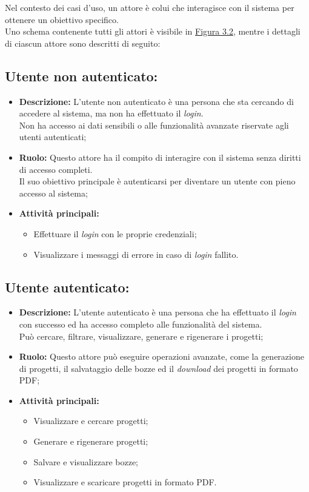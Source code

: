 Nel contesto dei casi d'uso, un attore è colui che interagisce con il sistema per ottenere un obiettivo specifico.\\
Uno schema contenente tutti gli attori è visibile in {\hyperref[fig:attori-casi-duso]{Figura 3.2}}, mentre i dettagli di ciascun attore sono descritti di seguito:

\subsection*{Utente non autenticato:}

\begin{itemize}
    \item \textbf{Descrizione:}  L'utente non autenticato è una persona che sta cercando di accedere al sistema, ma non ha effettuato il \textit{login}.\\
    Non ha accesso ai dati sensibili o alle funzionalità avanzate riservate agli utenti autenticati;
    \item \textbf{Ruolo:} Questo attore ha il compito di interagire con il sistema senza diritti di accesso completi.\\
    Il suo obiettivo principale è autenticarsi per diventare un utente con pieno accesso al sistema;
    \item \textbf{Attività principali:}
        \begin{itemize}
            \item Effettuare il \textit{login} con le proprie credenziali;
            \item Visualizzare i messaggi di errore in caso di \textit{login} fallito.
        \end{itemize}
\end{itemize}

\subsection*{Utente autenticato:}

\begin{itemize}
    \item \textbf{Descrizione:}  L'utente autenticato è una persona che ha effettuato il \textit{login} con successo ed ha accesso completo alle funzionalità del sistema.\\
    Può cercare, filtrare, visualizzare, generare e rigenerare i progetti;
    \item \textbf{Ruolo:} Questo attore può eseguire operazioni avanzate, come la generazione di progetti, il salvataggio delle bozze ed il \textit{download} dei progetti in formato PDF;
    \item \textbf{Attività principali:}
        \begin{itemize}
            \item Visualizzare e cercare progetti;
            \item Generare e rigenerare progetti;
            \item Salvare e visualizzare bozze;
            \item Visualizzare e scaricare progetti in formato PDF.
        \end{itemize}
\end{itemize}

